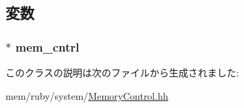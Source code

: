 \subsection{変数}
\hypertarget{classMemoryControl_1_1MemCntrlEvent_a9b07b40513d351ef4d737a15042c1935}{
\subsubsection[{mem\_\-cntrl}]{$\ast$ {\bf mem\_\-cntrl}}}
\label{classMemoryControl_1_1MemCntrlEvent_a9b07b40513d351ef4d737a15042c1935}


このクラスの説明は次のファイルから生成されました:\begin{DoxyCompactItemize}
\item 
mem/ruby/system/\hyperlink{MemoryControl_8hh}{MemoryControl.hh}\end{DoxyCompactItemize}
